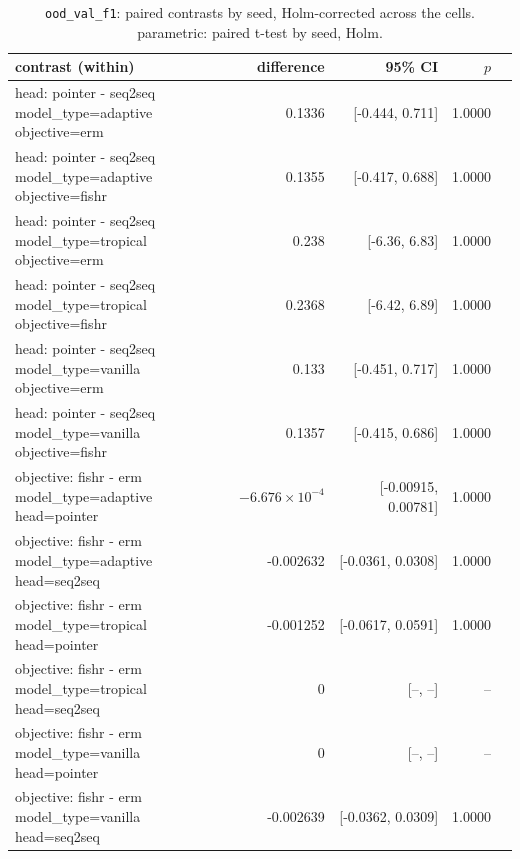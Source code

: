 \documentclass[10pt]{article}
\begin{document}
{\small
\begin{longtable}{lrrrl}
\caption{\texttt{ood\_val\_f1}: paired contrasts by seed, Holm-corrected across the cells. parametric: paired t-test by seed, Holm.}\label{tab:paired-ood_val_f1}\\
\toprule
contrast (within) & difference & 95\% CI & $p$ & \\
\midrule
\endhead
\makecell[l]{head: pointer - seq2seq\\\footnotesize model\_type=adaptive objective=erm } & 0.1336 & [-0.444, 0.711] & 1.0000 & \\
\makecell[l]{head: pointer - seq2seq\\\footnotesize model\_type=adaptive objective=fishr } & 0.1355 & [-0.417, 0.688] & 1.0000 & \\
\makecell[l]{head: pointer - seq2seq\\\footnotesize model\_type=tropical objective=erm } & 0.238 & [-6.36, 6.83] & 1.0000 & \\
\makecell[l]{head: pointer - seq2seq\\\footnotesize model\_type=tropical objective=fishr } & 0.2368 & [-6.42, 6.89] & 1.0000 & \\
\makecell[l]{head: pointer - seq2seq\\\footnotesize model\_type=vanilla objective=erm } & 0.133 & [-0.451, 0.717] & 1.0000 & \\
\makecell[l]{head: pointer - seq2seq\\\footnotesize model\_type=vanilla objective=fishr } & 0.1357 & [-0.415, 0.686] & 1.0000 & \\
\makecell[l]{objective: fishr - erm\\\footnotesize model\_type=adaptive head=pointer } & $-6.676\times10^{-4}$ & [-0.00915, 0.00781] & 1.0000 & \\
\makecell[l]{objective: fishr - erm\\\footnotesize model\_type=adaptive head=seq2seq } & -0.002632 & [-0.0361, 0.0308] & 1.0000 & \\
\makecell[l]{objective: fishr - erm\\\footnotesize model\_type=tropical head=pointer } & -0.001252 & [-0.0617, 0.0591] & 1.0000 & \\
\makecell[l]{objective: fishr - erm\\\footnotesize model\_type=tropical head=seq2seq } & 0 & [--, --] & -- & \\
\makecell[l]{objective: fishr - erm\\\footnotesize model\_type=vanilla head=pointer } & 0 & [--, --] & -- & \\
\makecell[l]{objective: fishr - erm\\\footnotesize model\_type=vanilla head=seq2seq } & -0.002639 & [-0.0362, 0.0309] & 1.0000 & \\
\bottomrule
\end{longtable}
}
\end{document}
